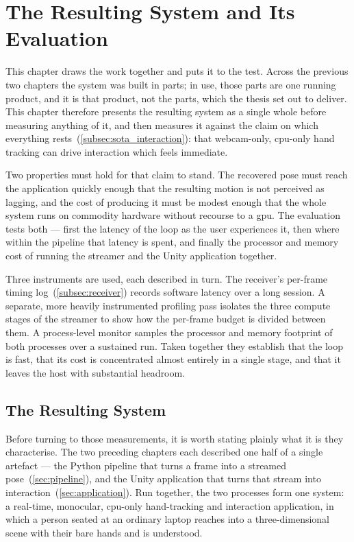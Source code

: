 
\section{The Resulting System and Its Evaluation}\label{sec:evaluation}

This chapter draws the work together and puts it to the test. Across the previous
two chapters the system was built in parts; in use, those parts are one running
product, and it is that product, not the parts, which the thesis set out to
deliver. This chapter therefore presents the resulting system as a single whole
before measuring anything of it, and then measures it against the claim on which
everything rests~(\autoref{subsec:sota_interaction}): that webcam-only,
\acrshort{cpu}-only hand tracking can drive interaction which feels immediate.

Two properties must hold for that claim to stand. The recovered pose must reach
the application quickly enough that the resulting motion is not perceived as
lagging, and the cost of producing it must be modest enough that the whole system
runs on commodity hardware without recourse to a \acrshort{gpu}. The evaluation
tests both --- first the latency of the loop as the user experiences it, then
where within the pipeline that latency is spent, and finally the processor and
memory cost of running the streamer and the Unity application together.

Three instruments are used, each described in turn. The receiver's per-frame
timing log~(\autoref{subsec:receiver}) records software latency over a
long session. A separate, more heavily instrumented profiling pass isolates the
three compute stages of the streamer to show how the per-frame budget is divided
between them. A process-level monitor samples the processor and memory footprint
of both processes over a sustained run. Taken together they establish that the
loop is fast, that its cost is concentrated almost entirely in a single stage, and
that it leaves the host with substantial headroom.



\subsection{The Resulting System}\label{subsec:resulting_system}

Before turning to those measurements, it is worth stating plainly what it is
they characterise. The two preceding chapters each described one half of a single
artefact --- the Python pipeline that turns a frame into a streamed
pose~(\autoref{sec:pipeline}), and the Unity application that turns that stream
into interaction~(\autoref{sec:application}). Run together, the two processes form
one system: a real-time, monocular, \acrshort{cpu}-only hand-tracking and
interaction application, in which a person seated at an ordinary laptop reaches
into a three-dimensional scene with their bare hands and is understood.

